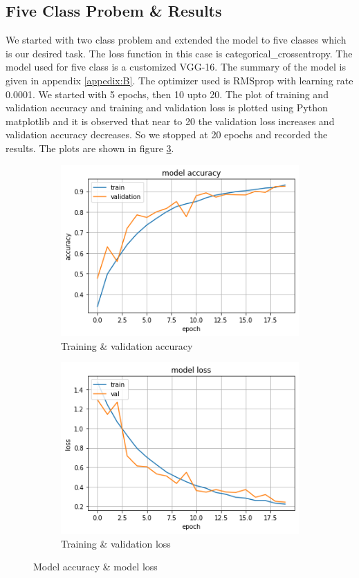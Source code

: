 \subsection{Five Class Probem \& Results}
We started with two class problem and extended the model to five classes
which is our desired task. The loss function in this case is categorical\_crossentropy.
The model used for five class is a customized VGG-16. The summary of the model
is given in appendix \ref{appedix:B}. The optimizer used is RMSprop with
learning rate 0.0001. We started with 5 epochs, then 10 upto 20. The plot of training
and validation accuracy and training and validation loss is plotted using Python
matplotlib and it is observed that near to 20 the validation loss
increases and validation accuracy decreases. So we stopped at 20 epochs
and recorded the results. The plots are shown in
figure \ref{fig:4.4}.
\begin{figure}[htbp]
    \centering
    \begin{subfigure}[t]{0.45\textwidth}
        \includegraphics[scale = 0.52]{CHAPTERS/Chapter-4/Images/4.4a}
        \caption{Training \& validation accuracy}
        \label{fig:4.4a}
    \end{subfigure}
    \begin{subfigure}[t]{0.45\textwidth}
        \includegraphics[scale = 0.52]{CHAPTERS/Chapter-4/Images/4.4b}
        \caption{Training \& validation loss}
        \label{fig:4.4b}
    \end{subfigure}
    \caption[]{Model accuracy \& model loss}
    \label{fig:4.4}
  \end{figure}
